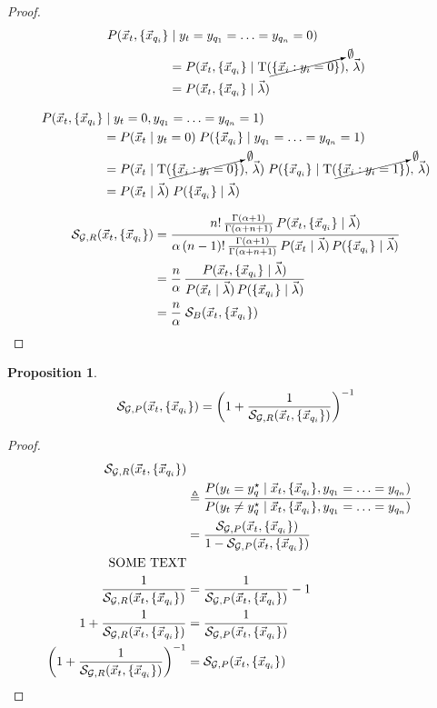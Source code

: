 \documentclass{article}
\newcommand{\set}[1]{\{{#1}\}}
\theoremstyle{break}
\newtheorem{proposition}{Proposition}[section]
\begin{document}
\begin{proof}
      \begin{align}
        P(\target, \queryset &\mid \yt = \sameyq = 0) \\
        & = P(\target, \queryset \mid 
            \sstats(\cancelto{\emptyset}{\set{\vec x_i: y_i=0}}), \, \hypers) \\
        & = P(\target, \queryset \mid \hypers)
      \end{align}

      \begin{align}
        P(\target, \queryset &\mid \yt = 0, \sameyq = 1) \\
        & = P(\target \mid \yt=0) \; P(\queryset \mid \sameyq=1) \\
        & = P(\target \mid 
            \sstats(\cancelto{\emptyset}{\set{\vec x_i: y_i=0}}), \, \hypers)
            \; P(\queryset \mid 
            \sstats(\cancelto{\emptyset}{\set{\vec x_i: y_i=1}}), \, \hypers) \\
        & = P(\target \mid \hypers) \; P(\queryset \mid \hypers) \\
      \end{align}

    \begin{align}
      \rscoretq &= 
          \dfrac{n! \, \frac{\Gamma(\alpha+1)}{\Gamma(\alpha+n+1)}\,
          P(\target, \queryset \mid \hypers)}
          {\alpha \, (n-1)! \, \frac{\Gamma(\alpha+1)}{\Gamma(\alpha+n+1)}\,
          P(\target \mid \hypers) \, P(\queryset \mid \hypers)} \\
      & = \frac{n}{\alpha} \, \frac{P(\target, \queryset \mid \hypers)}
          {P(\target \mid \hypers) \, P(\queryset \mid \hypers)} \\
      & =  \frac{n}{\alpha} \; \mS_B(\target, \queryset)
    \end{align} 
    \end{proof}

    \begin{proposition}
      \begin{equation}
        \pscore(\target, \queryset) = \left( 
            1 + \frac{1}{\rscoretq} \right)^{-1}
      \end{equation}
    \end{proposition}

    \begin{proof}
      \begin{align}
        \rscoretq \\
        &\triangleq \frac 
            {P(\yt = \yqset \mid \target, \queryset, \sameyq)}
            {P(\yt \neq \yqset \mid \target, \queryset, \sameyq)}\\
        &= \frac{\pscoretq}{1-\pscoretq}\\
        \text{SOME TEXT} \\
        \frac{1}{\rscoretq} &= \frac{1}{\pscoretq} - 1\\
         1 + \frac{1}{\rscoretq} &= \frac{1}{\pscoretq} \\
        \left(1 + \frac{1}{\rscoretq}\right)^{-1} &= \pscoretq
      \end{align}
    \end{proof}
\end{document}
